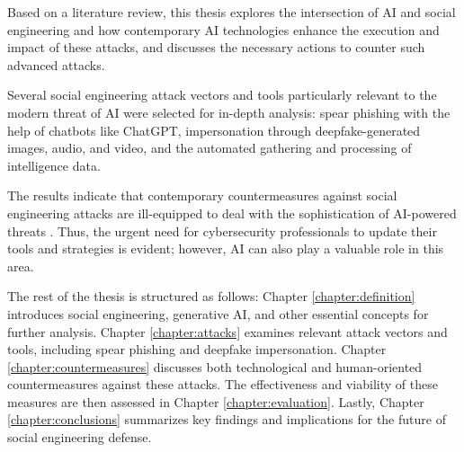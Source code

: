 Based on a literature review, this thesis explores the intersection of AI and social engineering and how contemporary AI technologies enhance the execution and impact of these attacks, and discusses the necessary actions to counter such advanced attacks. %

Several social engineering attack vectors and tools particularly relevant to the modern threat of AI were selected for in-depth analysis: spear phishing with the help of chatbots like ChatGPT, impersonation through deepfake-generated images, audio, and video, and the automated gathering and processing of intelligence data.




The results indicate that contemporary countermeasures against social engineering attacks are ill-equipped to deal with the sophistication of AI-powered threats \citep{fakhouriAIDrivenSolutionsForSocialEngineeringAttacks2024}. Thus, the urgent need for cybersecurity professionals to update their tools and strategies is evident; however, AI can also play a valuable role in this area.





%
%

The rest of the thesis is structured as follows: Chapter \ref{chapter:definition} introduces social engineering, generative AI, and other essential concepts for further analysis. Chapter \ref{chapter:attacks} examines relevant attack vectors and tools, including spear phishing and deepfake impersonation. Chapter \ref{chapter:countermeasures} discusses both technological and human-oriented countermeasures against these attacks. The effectiveness and viability of these measures are then assessed in Chapter \ref{chapter:evaluation}. Lastly, Chapter \ref{chapter:conclusions} summarizes key findings and implications for the future of social engineering defense.




